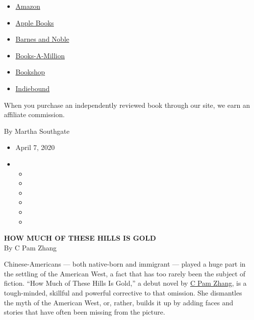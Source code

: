 \begin{itemize}
\tightlist
\item
  \href{https://www.amazon.com/gp/search?index=books\&tag=NYTBSREV-20\&field-keywords=How+Much+of+These+Hills+Is+Gold+C+Pam+Zhang}{Amazon}
\item
  \href{https://du-gae-books-dot-nyt-du-prd.appspot.com/buy?title=How+Much+of+These+Hills+Is+Gold\&author=C+Pam+Zhang}{Apple
  Books}
\item
  \href{https://www.anrdoezrs.net/click-7990613-11819508?url=https\%3A\%2F\%2Fwww.barnesandnoble.com\%2Fw\%2F\%3Fean\%3D9780525537205}{Barnes
  and Noble}
\item
  \href{https://www.anrdoezrs.net/click-7990613-35140?url=https\%3A\%2F\%2Fwww.booksamillion.com\%2Fp\%2FHow\%2BMuch\%2Bof\%2BThese\%2BHills\%2BIs\%2BGold\%2FC\%2BPam\%2BZhang\%2F9780525537205}{Books-A-Million}
\item
  \href{https://bookshop.org/a/3546/9780525537205}{Bookshop}
\item
  \href{https://www.indiebound.org/book/9780525537205?aff=NYT}{Indiebound}
\end{itemize}

When you purchase an independently reviewed book through our site, we
earn an affiliate commission.

By Martha Southgate

\begin{itemize}
\item
  April 7, 2020
\item
  \begin{itemize}
  \item
  \item
  \item
  \item
  \item
  \item
  \end{itemize}
\end{itemize}

\textbf{HOW MUCH OF THESE HILLS IS GOLD}\\
By C Pam Zhang

Chinese-Americans --- both native-born and immigrant --- played a huge
part in the settling of the American West, a fact that has too rarely
been the subject of fiction. ``How Much of These Hills Is Gold,'' a
debut novel by
\href{https://www.nytimes.com/2020/04/04/books/c-pam-zhang-how-much-of-these-hills-is-gold.html}{C
Pam Zhang}, is a tough-minded, skillful and powerful corrective to that
omission. She dismantles the myth of the American West, or, rather,
builds it up by adding faces and stories that have often been missing
from the picture.


